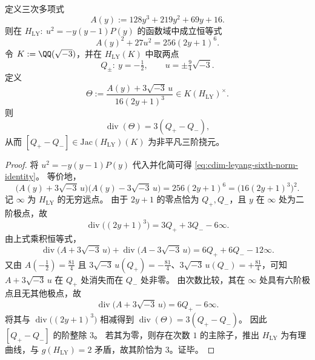 \begin{proposition}\label{prop:cdim-leyang-sixth-norm-identity-and-3torsion}
定义三次多项式
\[
A(y):=128y^3+219y^2+69y+16.
\]
则在 \(H_{\mathrm{LY}}:\ u^2=-y(y-1)P(y)\) 的函数域中成立恒等式
\begin{equation}\label{eq:cdim-leyang-sixth-norm-identity}
A(y)^2+27u^2=256(2y+1)^6.
\end{equation}
令 \(K:=\QQ(\sqrt{-3})\)，并在 \(H_{\mathrm{LY}}(K)\) 中取两点
\[
Q_\pm:\ y=-\tfrac12,\qquad u=\pm \tfrac94\sqrt{-3}.
\]
定义
\begin{equation}\label{eq:cdim-leyang-theta-kummer}
\Theta:=\frac{A(y)+3\sqrt{-3}\,u}{16(2y+1)^3}\in K(H_{\mathrm{LY}})^\times.
\end{equation}
则
\[
\operatorname{div}(\Theta)=3(Q_+-Q_-),
\]
从而 \([Q_+-Q_-]\in\mathrm{Jac}(H_{\mathrm{LY}})(K)\) 为非平凡三阶挠元。
\end{proposition}
\begin{proof}
将 \(u^2=-y(y-1)P(y)\) 代入并化简可得 \eqref{eq:cdim-leyang-sixth-norm-identity}。
等价地，
\[
\bigl(A(y)+3\sqrt{-3}\,u\bigr)\bigl(A(y)-3\sqrt{-3}\,u\bigr)=256(2y+1)^6=\bigl(16(2y+1)^3\bigr)^2.
\]
记 \(\infty\) 为 \(H_{\mathrm{LY}}\) 的无穷远点。
由于 \(2y+1\) 的零点恰为 \(Q_+,Q_-\)，且 \(y\) 在 \(\infty\) 处为二阶极点，故
\[
\operatorname{div}\bigl((2y+1)^3\bigr)=3Q_++3Q_--6\infty.
\]
由上式乘积恒等式，
\[
\operatorname{div}\bigl(A+3\sqrt{-3}\,u\bigr)+\operatorname{div}\bigl(A-3\sqrt{-3}\,u\bigr)
=6Q_++6Q_--12\infty.
\]
又由 \(A(-\tfrac12)=\tfrac{81}{4}\) 且 \(3\sqrt{-3}\,u(Q_+)= -\tfrac{81}{4}\)、\(3\sqrt{-3}\,u(Q_-)=+\tfrac{81}{4}\)，可知 \(A+3\sqrt{-3}\,u\) 在 \(Q_+\) 处消失而在 \(Q_-\) 处非零。
由次数比较，其在 \(\infty\) 处具有六阶极点且无其他极点，故
\[
\operatorname{div}\bigl(A+3\sqrt{-3}\,u\bigr)=6Q_+-6\infty.
\]
将其与 \(\operatorname{div}\bigl((2y+1)^3\bigr)\) 相减得到 \(\operatorname{div}(\Theta)=3(Q_+-Q_-)\)。
因此 \([Q_+-Q_-]\) 的阶整除 \(3\)。
若其为零，则存在次数 \(1\) 的主除子，推出 \(H_{\mathrm{LY}}\) 为有理曲线，与 \(g(H_{\mathrm{LY}})=2\) 矛盾，故其阶恰为 \(3\)。证毕。
\end{proof}

